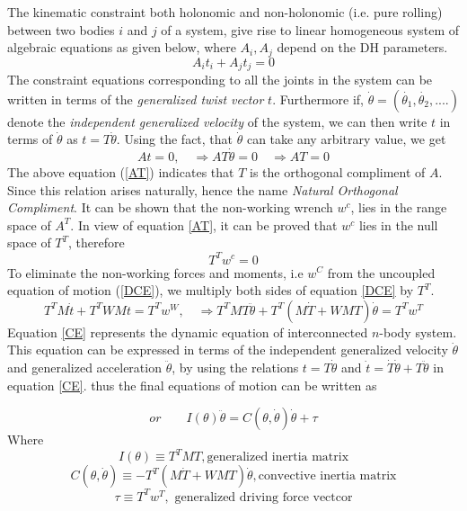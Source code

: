 The kinematic constraint both holonomic and non-holonomic (i.e. pure rolling) between two bodies $i$ and $j$ of a system, give rise to linear homogeneous system of algebraic equations \cite{angeles2013fundamentals} as given below, where $A_i,A_j$ depend on the DH parameters.
\begin{equation}
A_it_i+A_jt_j=0
\end{equation}
The constraint equations corresponding to all the joints in the system can be written in terms of the \textit{generalized twist vector} $t$. Furthermore if, $ \dot{\theta}=(\dot{\theta_1},\dot{\theta_2},....)$ denote the \textit{independent generalized velocity} of the system, we can then write $t$ in terms of $\dot{\theta}$ as $t=T\dot{\theta}$. Using the fact, that $\dot{\theta}$ can take any arbitrary value, we get
\begin{equation}
\label{AT}
At=0 , \quad \Rightarrow  AT\dot{\theta}=0\quad \Rightarrow AT=0
\end{equation}
The above equation (\ref{AT}) indicates that $T$ is the orthogonal compliment of $A$. Since this relation arises naturally, hence the name \textit{Natural Orthogonal Compliment}. It can be shown \cite{angeles2013fundamentals} that the non-working wrench $w^c$, lies in the range space of $A^T$. In view of equation \ref{AT}, it can be proved that $w^c$ lies in the null space of $T^T$, therefore
\begin{equation}
T^Tw^c=0
\end{equation}
To eliminate the non-working forces and moments, i.e $w^C$ from the uncoupled equation of motion (\ref{DCE}), we multiply both sides of equation \ref{DCE} by $T^T$.
\begin{equation}
 T^TM\dot{t}+T^TWMt=T^Tw^W, \quad
 \Rightarrow T^TMT\ddot{\theta}+T^T(M\dot{T}+WMT)\dot{\theta}=T^Tw^T
\end{equation}
Equation \ref{CE} represents the dynamic equation of  interconnected $n$-body system. This equation can be expressed in terms of the independent generalized velocity $\dot{\theta}$ and generalized acceleration $\ddot{\theta}$, by using the relations $t=T\dot{\theta}$ and $\dot{t}=\dot{T}\dot{\theta}+T\ddot{\theta}$  in equation \ref{CE}.
thus the final equations of motion can be written as

\begin{equation}
\label{CE}
or\quad \quad I(\theta)\ddot{\theta}=C(\theta,\dot{\theta})\dot{\theta}+\tau
\end{equation}
Where
\[I(\theta)\equiv T^TMT,\text{generalized inertia matrix}\]
\[C(\theta,\dot{\theta})\equiv -T^T(M\dot{T}+WMT)\dot{\theta}, \text{convective inertia matrix}\]
\[\tau\equiv T^Tw^T,\text{ generalized driving force vectcor}\]


